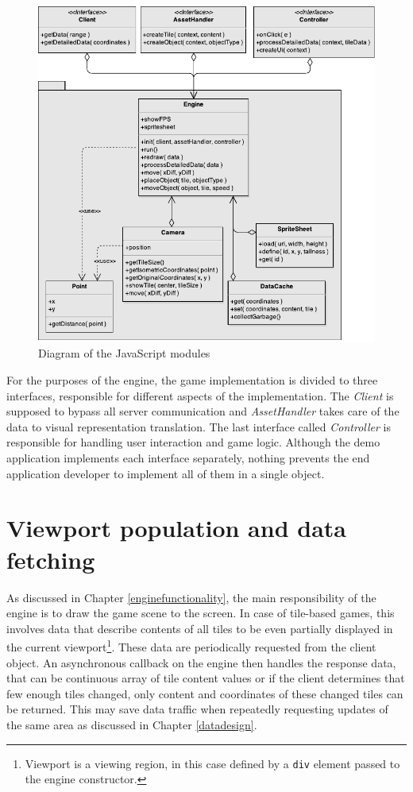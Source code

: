 \documentclass[11pt,oneside, final]{fithesis2}
\begin{document}
\begin{figure}[h]
	\centering
	\includegraphics[width=\textwidth]{thesis-classdiagram}
	\caption{Diagram of the JavaScript modules}
	\label{classdiagram}
\end{figure}

For the purposes of the engine, the game implementation is divided to three interfaces, responsible for different aspects of the implementation. The \emph{Client} is supposed to bypass all server communication and \emph{AssetHandler} takes care of the data to visual representation translation. The last interface called \emph{Controller} is responsible for handling user interaction and game logic. Although the demo application implements each interface separately, nothing prevents the end application developer to implement all of them in a single object.

\section{Viewport population and data fetching}
As discussed in Chapter \ref{enginefunctionality}, the main responsibility of the engine is to draw the game scene to the screen. In case of tile-based games, this involves data that describe contents of all tiles to be even partially displayed in the current viewport\footnote{Viewport is a viewing region, in this case defined by a \texttt{div} element passed to the engine constructor.}. These data are periodically requested from the client object. An asynchronous callback on the engine then handles the response data, that can be continuous array of tile content values or if the client determines that few enough tiles changed, only content and coordinates of these changed tiles can be returned. This may save data traffic when repeatedly requesting updates of the same area as discussed in Chapter \ref{datadesign}.
\end{document}
